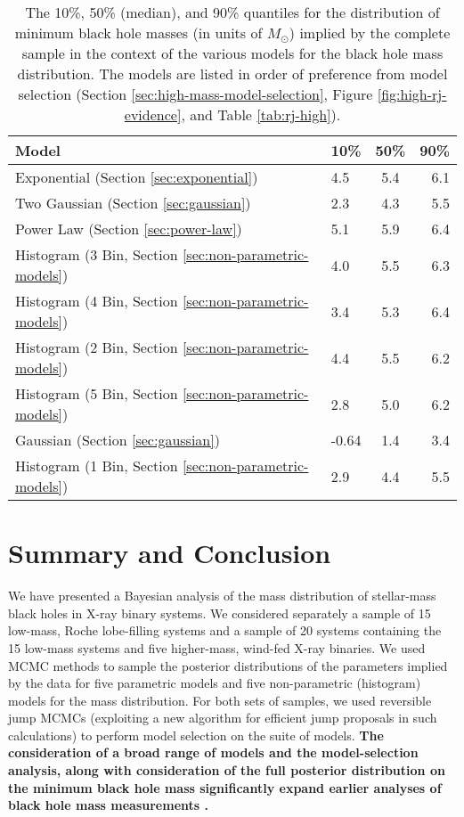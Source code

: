 \documentclass[preprint]{aastex}
\newcommand{\Msun}{M_\odot}
\newcommand{\changed}[1]{{\bf #1 }}
\begin{document}
\begin{table}
  \begin{center}
    \begin{tabular}{|l|l|c|r|}
      \hline
      Model & 10\% & 50\% & 90\% \\
      \hline \hline
      Exponential (Section \ref{sec:exponential}) & 4.5 & 5.4 & 6.1 \\
      \hline
      Two Gaussian (Section \ref{sec:gaussian}) & 2.3 & 4.3 & 5.5 \\
      \hline
      Power Law (Section \ref{sec:power-law}) & 5.1 & 5.9 & 6.4 \\
      \hline
      Histogram (3 Bin, Section \ref{sec:non-parametric-models}) & 4.0 & 5.5 & 6.3 \\
      \hline 
      Histogram (4 Bin, Section \ref{sec:non-parametric-models}) & 3.4 & 5.3 & 6.4 \\
      \hline
      Histogram (2 Bin, Section \ref{sec:non-parametric-models}) & 4.4 & 5.5 & 6.2 \\
      \hline
      Histogram (5 Bin, Section \ref{sec:non-parametric-models}) & 2.8 & 5.0 & 6.2 \\
      \hline
      Gaussian (Section \ref{sec:gaussian}) & -0.64 & 1.4 & 3.4 \\
      \hline 
      Histogram (1 Bin, Section \ref{sec:non-parametric-models}) & 2.9 & 4.4 & 5.5 \\
      \hline
    \end{tabular}
  \end{center}
  \caption{\label{tab:mmin-quants-high} The 10\%, 50\% (median), and 90\% quantiles for the distribution of minimum black hole masses (in units of $\Msun$) implied by the complete sample in the context of the various models for the black hole mass distribution.  The models are listed in order of preference from model selection (Section \ref{sec:high-mass-model-selection}, Figure \ref{fig:high-rj-evidence}, and Table \ref{tab:rj-high}). }
\end{table}

\section{Summary and Conclusion}
\label{sec:conclusion}

We have presented a Bayesian analysis of the mass distribution of
stellar-mass black holes in X-ray binary systems.  We considered
separately a sample of 15 low-mass, Roche lobe-filling systems and a
sample of 20 systems containing the 15 low-mass systems and five
higher-mass, wind-fed X-ray binaries.  We used MCMC methods to sample
the posterior distributions of the parameters implied by the data for
five parametric models and five non-parametric (histogram) models for
the mass distribution.  For both sets of samples, we used reversible
jump MCMCs (exploiting a new algorithm for efficient jump proposals in
such calculations) to perform model selection on the suite of models.
\changed{The consideration of a broad range of models and the
  model-selection analysis, along with consideration of the full
  posterior distribution on the minimum black hole mass significantly
  expand earlier analyses of black hole mass measurements
  \citep{Bailyn1998,Ozel2010}.}
\end{document}
